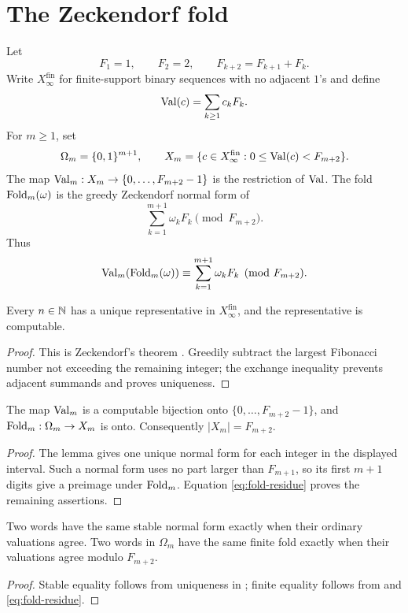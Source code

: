 \section{The Zeckendorf fold}
\label{sec:fold-interface}

Let
\[
 F_1=1,\qquad F_2=2,\qquad F_{k+2}=F_{k+1}+F_k .
\]
Write \(X_\infty^{\mathrm{fin}}\) for finite-support binary sequences with no
adjacent \(1\)'s and define
\[
 \operatorname{Val}(c)=\sum_{k\ge1}c_kF_k .
\]
For \(m\ge1\), set
\[
 \Omega_m=\{0,1\}^{m+1},\qquad
 X_m=\{c\in X_\infty^{\mathrm{fin}}:0\le\operatorname{Val}(c)<F_{m+2}\}.
\]
The map \(\operatorname{Val}_m:X_m\to\{0,\ldots,F_{m+2}-1\}\) is the restriction of
\(\operatorname{Val}\).  The fold \(\operatorname{Fold}_m(\omega)\) is the greedy Zeckendorf normal form
of
\[
 \sum_{k=1}^{m+1}\omega_kF_k\pmod {F_{m+2}} .
\]
Thus
\begin{equation}\label{eq:fold-residue}
 \operatorname{Val}_m(\operatorname{Fold}_m(\omega))\equiv
 \sum_{k=1}^{m+1}\omega_kF_k\pmod {F_{m+2}} .
\end{equation}

\begin{lemma}
\label{lem:greedy-zeckendorf-normalizer}
Every \(n\in\mathbb N\) has a unique representative in
\(X_\infty^{\mathrm{fin}}\), and the representative is computable.
\end{lemma}
\begin{proof}
This is Zeckendorf's theorem \cite{Zeckendorf1972}.  Greedily subtract the
largest Fibonacci number not exceeding the remaining integer; the exchange
inequality prevents adjacent summands and proves uniqueness.
\end{proof}

\begin{proposition}
\label{prop:finite-zeckendorf-residue-interface}
The map \(\operatorname{Val}_m\) is a computable bijection onto
\(\{0,\ldots,F_{m+2}-1\}\), and \(\operatorname{Fold}_m:\Omega_m\to X_m\) is onto.
Consequently \(|X_m|=F_{m+2}\).
\end{proposition}
\begin{proof}
The lemma gives one unique normal form for each integer in the displayed
interval.  Such a normal form uses no part larger than \(F_{m+1}\), so its
first \(m+1\) digits give a preimage under \(\operatorname{Fold}_m\).  Equation
\eqref{eq:fold-residue} proves the remaining assertions.
\end{proof}

\begin{proposition}
\label{prop:fold-confluence}
Two words have the same stable normal form exactly when their ordinary
valuations agree.  Two words in \(\Omega_m\) have the same finite fold exactly
when their valuations agree modulo \(F_{m+2}\).
\end{proposition}
\begin{proof}
Stable equality follows from uniqueness in
; finite equality follows from
 and
\eqref{eq:fold-residue}.
\end{proof}


